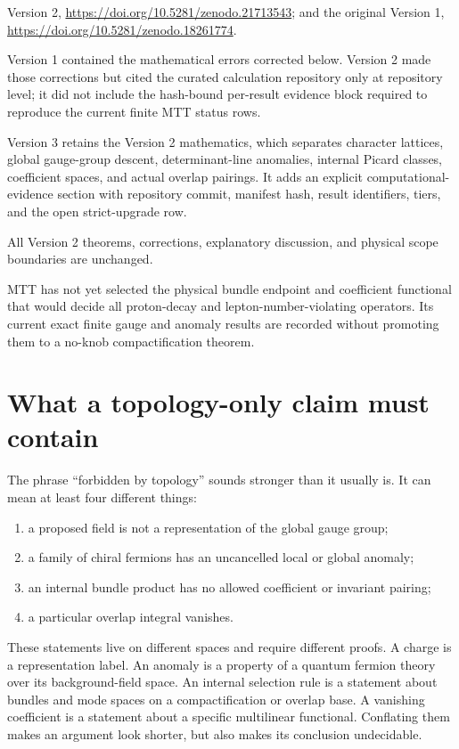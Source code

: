 \documentclass[11pt]{article}
\begin{document}
\begin{description}[style=nextline]
\item[Supersedes.]
Version 2, \url{https://doi.org/10.5281/zenodo.21713543}; and the original
Version 1, \url{https://doi.org/10.5281/zenodo.18261774}.
\item[Reason.]
Version 1 contained the mathematical errors corrected below. Version 2 made
those corrections but cited the curated calculation repository only at
repository level; it did not include the hash-bound per-result evidence block
required to reproduce the current finite MTT status rows.
\item[Resolution.]
Version 3 retains the Version 2 mathematics, which separates character
lattices, global gauge-group descent,
determinant-line anomalies, internal Picard classes, coefficient spaces, and
actual overlap pairings. It adds an explicit computational-evidence section
with repository commit, manifest hash, result identifiers, tiers, and the
open strict-upgrade row.
\item[Retained content.]
All Version 2 theorems, corrections, explanatory discussion, and physical
scope boundaries are unchanged.
\item[Open boundary.]
MTT has not yet selected the physical bundle endpoint and coefficient
functional that would decide all proton-decay and lepton-number-violating
operators. Its current exact finite gauge and anomaly results are recorded
without promoting them to a no-knob compactification theorem.
\end{description}

\tableofcontents

\section{What a topology-only claim must contain}

The phrase ``forbidden by topology'' sounds stronger than it usually is. It
can mean at least four different things:
\begin{enumerate}
\item a proposed field is not a representation of the global gauge group;
\item a family of chiral fermions has an uncancelled local or global anomaly;
\item an internal bundle product has no allowed coefficient or invariant
pairing;
\item a particular overlap integral vanishes.
\end{enumerate}
These statements live on different spaces and require different proofs. A
charge is a representation label. An anomaly is a property of a quantum
fermion theory over its background-field space. An internal selection rule
is a statement about bundles and mode spaces on a compactification or
overlap base. A vanishing coefficient is a statement about a specific
multilinear functional. Conflating them makes an argument look shorter, but
also makes its conclusion undecidable.
\end{document}
